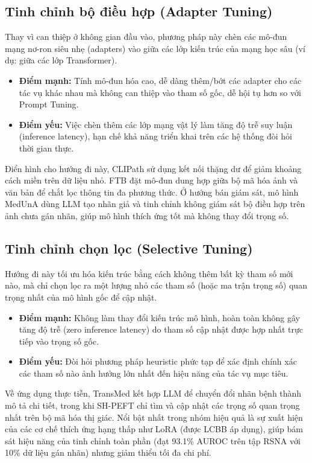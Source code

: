 \subsection{Tinh chỉnh bộ điều hợp (Adapter Tuning)}
Thay vì can thiệp ở không gian đầu vào, phương pháp này chèn các mô-đun mạng nơ-ron siêu nhẹ (adapters) vào giữa các lớp kiến trúc của mạng học sâu (ví dụ: giữa các lớp Transformer).
\begin{itemize}
    \item \textbf{Điểm mạnh:} Tính mô-đun hóa cao, dễ dàng thêm/bớt các adapter cho các tác vụ khác nhau mà không can thiệp vào tham số gốc, dễ hội tụ hơn so với Prompt Tuning.
    \item \textbf{Điểm yếu:} Việc chèn thêm các lớp mạng vật lý làm tăng độ trễ suy luận (inference latency), hạn chế khả năng triển khai trên các hệ thống đòi hỏi thời gian thực.
\end{itemize}
Điển hình cho hướng đi này, CLIPath \cite{CLIPath} sử dụng kết nối thặng dư để giảm khoảng cách miền trên dữ liệu nhỏ. FTB \cite{FTB} đặt mô-đun dung hợp giữa bộ mã hóa ảnh và văn bản để chắt lọc thông tin đa phương thức. Ở hướng bán giám sát, mô hình MedUnA \cite{MedUnA} dùng LLM tạo nhãn giả và tinh chỉnh không giám sát bộ điều hợp trên ảnh chưa gán nhãn, giúp mô hình thích ứng tốt mà không thay đổi trọng số.

\subsection{Tinh chỉnh chọn lọc (Selective Tuning)}
Hướng đi này tối ưu hóa kiến trúc bằng cách không thêm bất kỳ tham số mới nào, mà chỉ chọn lọc ra một lượng nhỏ các tham số (hoặc ma trận trọng số) quan trọng nhất của mô hình gốc để cập nhật.
\begin{itemize}
    \item \textbf{Điểm mạnh:} Không làm thay đổi kiến trúc mô hình, hoàn toàn không gây tăng độ trễ (zero inference latency) do tham số cập nhật được hợp nhất trực tiếp vào trọng số gốc.
    \item \textbf{Điểm yếu:} Đòi hỏi phương pháp heuristic phức tạp để xác định chính xác các tham số nào ảnh hưởng lớn nhất đến hiệu năng của tác vụ mục tiêu.
\end{itemize}
Về ứng dụng thực tiễn, TransMed \cite{TransMed} kết hợp LLM để chuyển đổi nhãn bệnh thành mô tả chi tiết, trong khi SH-PEFT \cite{SH-PEFT} chỉ tìm và cập nhật các trọng số quan trọng nhất trên bộ mã hóa thị giác. Nổi bật nhất trong nhóm hiệu quả là sự xuất hiện của các cơ chế thích ứng hạng thấp như LoRA (được LCBB \cite{LCBB} áp dụng), giúp bám sát hiệu năng của tinh chỉnh toàn phần (đạt 93.1\% AUROC trên tập RSNA với 10\% dữ liệu gán nhãn) nhưng giảm thiểu tối đa chi phí.

